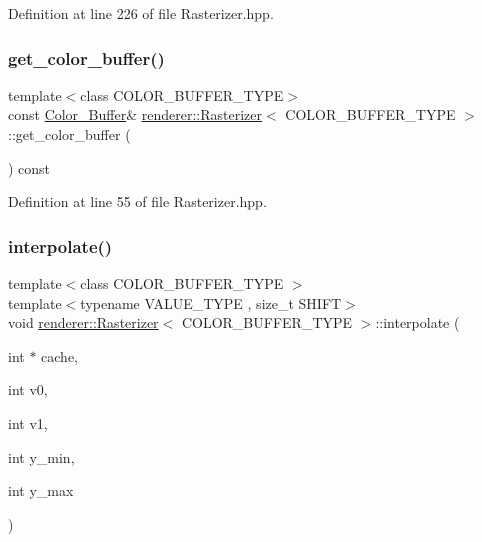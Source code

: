 Definition at line 226 of file Rasterizer.\+hpp.

\mbox{\label{classrenderer_1_1_rasterizer_aad1766bb1cf80e143aa3fefe7a3a52ff}} 
\subsubsection{\texorpdfstring{get\_color\_buffer()}{get\_color\_buffer()}}
{\footnotesize\ttfamily template$<$class C\+O\+L\+O\+R\+\_\+\+B\+U\+F\+F\+E\+R\+\_\+\+T\+Y\+PE$>$ \\
const \mbox{\hyperlink{classrenderer_1_1_rasterizer_a1568956faf65b03116e04b4cb0213770}{Color\+\_\+\+Buffer}}\& \mbox{\hyperlink{classrenderer_1_1_rasterizer}{renderer\+::\+Rasterizer}}$<$ C\+O\+L\+O\+R\+\_\+\+B\+U\+F\+F\+E\+R\+\_\+\+T\+Y\+PE $>$\+::get\+\_\+color\+\_\+buffer (\begin{DoxyParamCaption}{ }\end{DoxyParamCaption}) const\hspace{0.3cm}{\ttfamily [inline]}}



Definition at line 55 of file Rasterizer.\+hpp.

\mbox{\label{classrenderer_1_1_rasterizer_a913bf8c97f3aefada8ca6937fba1c746}} 
\subsubsection{\texorpdfstring{interpolate()}{interpolate()}}
{\footnotesize\ttfamily template$<$class C\+O\+L\+O\+R\+\_\+\+B\+U\+F\+F\+E\+R\+\_\+\+T\+Y\+PE $>$ \\
template$<$typename V\+A\+L\+U\+E\+\_\+\+T\+Y\+PE , size\+\_\+t S\+H\+I\+FT$>$ \\
void \mbox{\hyperlink{classrenderer_1_1_rasterizer}{renderer\+::\+Rasterizer}}$<$ C\+O\+L\+O\+R\+\_\+\+B\+U\+F\+F\+E\+R\+\_\+\+T\+Y\+PE $>$\+::interpolate (\begin{DoxyParamCaption}\item[{int $\ast$}]{cache,  }\item[{int}]{v0,  }\item[{int}]{v1,  }\item[{int}]{y\+\_\+min,  }\item[{int}]{y\+\_\+max }\end{DoxyParamCaption})\hspace{0.3cm}{\ttfamily [private]}}



